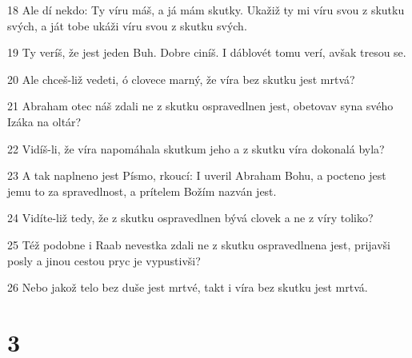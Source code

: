 \par 18 Ale dí nekdo: Ty víru máš, a já mám skutky. Ukažiž ty mi víru svou z skutku svých, a ját tobe ukáži víru svou z skutku svých.
\par 19 Ty veríš, že jest jeden Buh. Dobre ciníš. I dáblovét tomu verí, avšak tresou se.
\par 20 Ale chceš-liž vedeti, ó clovece marný, že víra bez skutku jest mrtvá?
\par 21 Abraham otec náš zdali ne z skutku ospravedlnen jest, obetovav syna svého Izáka na oltár?
\par 22 Vidíš-li, že víra napomáhala skutkum jeho a z skutku víra dokonalá byla?
\par 23 A tak naplneno jest Písmo, rkoucí: I uveril Abraham Bohu, a pocteno jest jemu to za spravedlnost, a prítelem Božím nazván jest.
\par 24 Vidíte-liž tedy, že z skutku ospravedlnen bývá clovek a ne z víry toliko?
\par 25 Též podobne i Raab nevestka zdali ne z skutku ospravedlnena jest, prijavši posly a jinou cestou pryc je vypustivši?
\par 26 Nebo jakož telo bez duše jest mrtvé, takt i víra bez skutku jest mrtvá.

\chapter{3}

